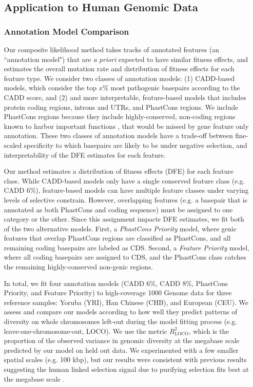 \documentclass[11pt]{article}
\begin{document}
\subsection*{Application to Human Genomic Data}

\subsubsection*{Annotation Model Comparison}
\label{sec:annotation}

Our composite likelihood method takes tracks of annotated features (an
``annotation model") that are \emph{a priori} expected to have similar fitness
effects, and estimates the overall mutation rate and distribution of fitness
effects for each feature type. We consider two classes of annotation models:
(1) CADD-based models, which consider the top $x\%$ most pathogenic basepairs
according to the CADD score, and (2) and more interpretable, feature-based
models that includes protein coding regions, introns and UTRs, and PhastCons
regions. We include PhastCons regions because they include 
highly-conserved, non-coding regions known to harbor important functions
\parencite{Meader2010-hm,Harmston2013-tt,Katzman2007-gq,Siepel2005-wh}, that
would be missed by gene feature only annotation. These two classes of
annotation models have a trade-off between fine-scaled specificity to which
basepairs are likely to be under negative selection, and interpretability of
the DFE estimates for each feature.

Our method estimates a distribution of fitness effects (DFE) for each feature
class. While CADD-based models only have a single conserved feature class (e.g.
CADD 6\%), feature-based models can have multiple feature classes under varying
levels of selective constrain. However, overlapping features (e.g. a basepair
that is annotated as both PhastCons and coding sequence) must be assigned to
one category or the other. Since this assignment impacts DFE estimates, we fit
both of the two alternative models. First, a \emph{PhastCons Priority} model,
where genic features that overlap PhastCons regions are classified as
PhastCons, and all remaining coding basepairs are labeled as CDS. Second, a
\emph{Feature Priority} model, where all coding basepairs are assigned to CDS,
and the PhastCons class catches the remaining highly-conserved non-genic
regions. 

In total, we fit four annotation models (CADD 6\%, CADD 8\%, PhastCons
Priority, and Feature Priority) to high-coverage 1000 Genome data for three
reference samples: Yoruba (YRI), Han Chinese (CHB), and European (CEU). We assess and compare our models according to how well they predict
patterns of diversity on whole chromosomes left-out during the model fitting
process (e.g. leave-one-chromosome-out, LOCO). We use the metric
$R_\text{LOCO}^2$, which is the proportion of the observed variance in genomic
diversity at the megabase scale predicted by our model on held out data. 
We experimented with a few smaller spatial scales (e.g. 100 kbp), but our results were consistent 
with previous results suggesting the human linked selection signal due to purifying selection
fits best at the megabase scale \parencite{Murphy2022-sj}.
\end{document}
